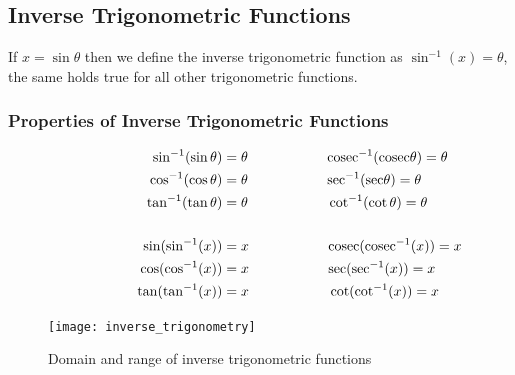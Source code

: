 \subsection{Inverse Trigonometric Functions}
If \textit{$x = \sin\theta$} then we define the inverse trigonometric function as \textit{$\sin^{-1}(x) = \theta$}, the same holds true for all other trigonometric functions.

\subsubsection{Properties of Inverse Trigonometric Functions}

\begin{align*}
\hspace{20mm} \sin^{-1}(\sin\theta) &= \theta  \hspace{20mm} \mathrm{cosec}^{-1}(\mathrm{cosec}\theta) = \theta\\
\hspace{20mm} \cos^{-1}(\cos\theta) &= \theta  \hspace{20mm} \mathrm{sec}^{-1}(\mathrm{sec}\theta) = \theta\\ 
\hspace{20mm} \tan^{-1}(\tan\theta) &= \theta \hspace{20mm} \cot^{-1}(\cot\theta) = \theta \\ \\
\hspace{20mm} \sin(\sin^{-1}(x)) &= x  \hspace{20mm} \mathrm{cosec}(\mathrm{cosec}^{-1}(x)) = x\\
\hspace{20mm} \cos(\cos^{-1}(x)) &= x  \hspace{20mm} \mathrm{sec}(\mathrm{sec}^{-1}(x)) = x\\ 
\hspace{20mm} \tan(\tan^{-1}(x)) &= x \hspace{20mm} \cot(\cot^{-1}(x)) = x 
\end{align*}

\begin{figure}[ht]
    \centering
    \texttt{[image: inverse\_trigonometry]}
    \caption{Domain and range of inverse trigonometric functions}
    \label{inverse_trig}
\end{figure}

